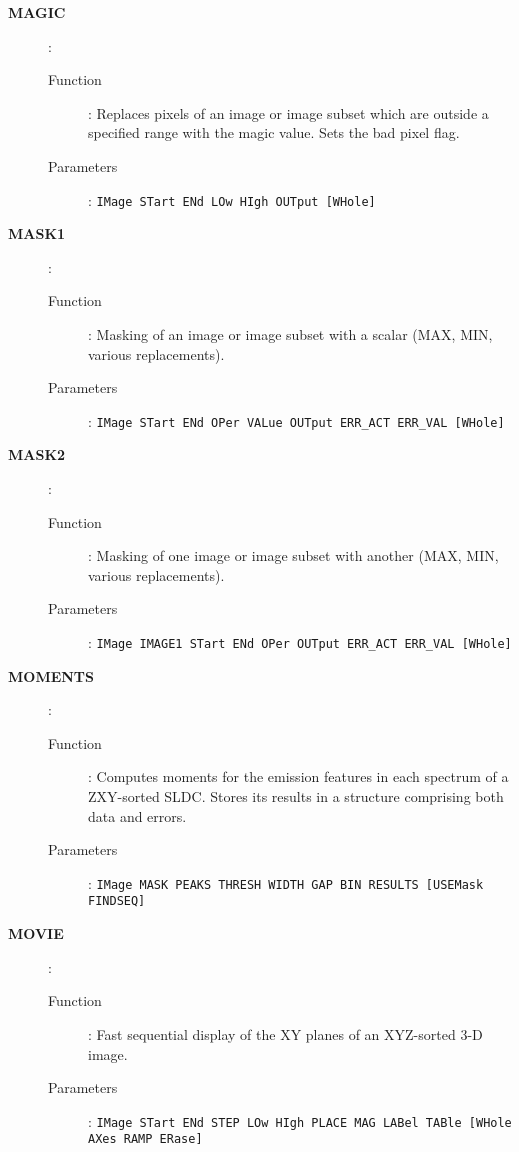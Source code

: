 \begin{description}
\item[\large\bf MAGIC]:
   \begin{description}
   \item[Function]: 
      Replaces pixels of an image or image subset which are outside a
      specified range with the magic value. Sets the bad pixel flag.            
   \item[Parameters]: 
      {\tt IMage STart ENd LOw HIgh OUTput [WHole]}
   \end{description}

\item[\large\bf MASK1]:
   \begin{description}
   \item[Function]: 
      Masking of an image or image subset with a scalar (MAX, MIN, various 
      replacements).
   \item[Parameters]: 
      {\tt IMage STart ENd OPer VALue OUTput ERR\_ACT ERR\_VAL [WHole]}
   \end{description}

\item[\large\bf MASK2]:
   \begin{description}
   \item[Function]: 
      Masking of one image or image subset with another (MAX, MIN, various 
      replacements).
   \item[Parameters]: 
      {\tt IMage IMAGE1 STart ENd OPer OUTput ERR\_ACT ERR\_VAL [WHole]}
   \end{description}

\item[\large\bf MOMENTS]:
   \begin{description}
   \item[Function]:
      Computes moments for the emission features in each spectrum of a
      ZXY-sorted SLDC. Stores its results in a structure comprising both data
      and errors.
   \item[Parameters]:
      {\tt IMage MASK PEAKS THRESH WIDTH GAP BIN RESULTS [USEMask \\
      FINDSEQ]}
   \end{description}

\item[\large\bf MOVIE]:
   \begin{description}
   \item[Function]:
      Fast sequential display of the XY planes of an XYZ-sorted 3-D image.
   \item[Parameters]:
      {\tt IMage STart ENd STEP LOw HIgh PLACE MAG LABel TABle [WHole\\
      AXes RAMP ERase]}
   \end{description}


\end{description}
